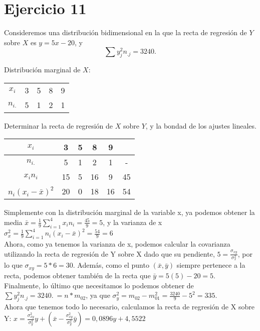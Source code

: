 \documentclass[a4paper,12pt]{article}
\begin{document}
\section*{Ejercicio 11}
Consideremos una distribución bidimensional en la que la recta de regresión de $Y$ sobre $X$ es $y = 5x - 20$, y
\[ \sum y_j^2 n_{.j} = 3240. \]

Distribución marginal de $X$:
\begin{center}
\begin{tabular}{c|cccc}
$x_i$ & 3 & 5 & 8 & 9 \\
$n_{i.}$ & 5 & 1 & 2 & 1 \\
\end{tabular}
\end{center}

Determinar la recta de regresión de $X$ sobre $Y$, y la bondad de los ajustes lineales.

\begin{center}
\begin{tabular}{c|cccc|c}
$x_i$ & 3 & 5 & 8 & 9 &\\
\hline
$n_{i.}$ & 5 & 1 & 2 & 1 &-\\
$x_in_i$ & 15 & 5 & 16 & 9 & 45\\
$n_i(x_i-\bar x)^2$ &20&0&18&16&54\\
\end{tabular}
\end{center}

Simplemente con la distribución marginal de la variable x, ya podemos obtener la media $\bar x=\frac{1}{9} \sum\limits_{i=1}^4 x_in_i = \frac{45}{9}=5$, y la varianza de x $\sigma^2_x=\frac{1}{9} \sum\limits_{i=1}^4 n_i(x_i- \bar x)^2 = \frac{54}{9}=6$\\
Ahora, como ya tenemos la varianza de x, podemos calcular la covarianza utilizando la recta de regresión de Y sobre X dado que su pendiente, $5=\frac{\sigma_{xy}}{\sigma_x^2}$, por lo que $\sigma_{xy}=5*6=30$. Además, como el punto $(\bar x, \bar y)$ siempre pertenece a la recta, podemos obtener también de la recta que $\bar y=5(5) - 20 = 5$.\\
Finalmente, lo último que necesitamos lo podemos obtener de $ \sum y_j^2 n_{.j} = 3240. \ =n* m_{02}$, ya que $\sigma_y^2= m_{02} -m_{01}^2=\frac{3240}{9}-5^2 = 335$.\\
Ahora que tenemos todo lo necesario, calculamos la recta de regresión de X sobre Y: $x= \frac{\sigma_{xy}^2}{\sigma_y^2}y + (\bar x -\frac{\sigma_{xy}^2}{\sigma_y^2} \bar y)= 0,0896y+ 4,5522$\\
\end{document}
